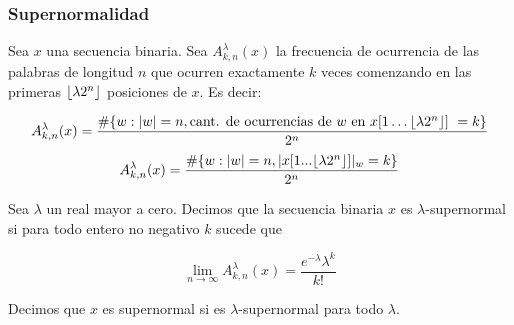 \documentclass[10pt,mathserif]{beamer}%
\begin{document}
\begin{frame}
\frametitle{Supernormalidad}
Sea $x$ una secuencia binaria. Sea $A^\lambda_{k,n}(x)$  la frecuencia de ocurrencia de las palabras de longitud $n$ que ocurren exactamente $k$ veces comenzando en las primeras $\lfloor \lambda 2^n \rfloor$ posiciones de $x$. Es decir:



$$A^\lambda_{k,n}(x) = \frac{\#\{w: |w| = n  , \text{cant. de ocurrencias de $w$ en $x[1\dots\lfloor \lambda 2^n \rfloor]$ } = k\}}{2^n}$$
\pause
\bigskip
$$A^\lambda_{k,n}(x) = \frac{\#\{w: |w| = n  , |x[1...\lfloor \lambda 2^n \rfloor]|_w = k\}}{2^n}$$
\pause
\begin{definition}
  Sea $\lambda$ un real mayor a cero. Decimos que la secuencia binaria $x$ es $\lambda$-supernormal si para todo entero no negativo $k$ sucede que
  
  $$\lim_{n\to\infty} A^\lambda_{k,n}(x) = \frac{e^{-\lambda}\lambda^k}{k!}$$

  Decimos que $x$ es supernormal si es $\lambda$-supernormal para todo $\lambda.$
\end{definition}
\end{frame}
\end{document}
